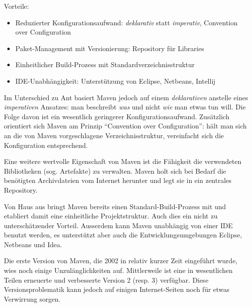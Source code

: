 \ifslides
Vorteile:
\begin{itemize}
\item Reduzierter Konfigurationsaufwand:
       {\em deklarativ} statt {\em imperativ}, Convention over Configuration
\item Paket-Management mit Versionierung: Repository für Libraries
\item Einheitlicher Build-Prozess mit Standardverzeichnisstruktur
\item IDE-Unabhängigkeit: Unterstützung von Eclipse, Netbeans, Intellij
\end{itemize}
\else
Im Unterschied zu Ant basiert Maven jedoch auf einem
{\em deklarativen} anstelle eines {\em imperativen} Ansatzes:
man beschreibt {\em was} und
nicht {\em wie} man etwas tun will. Die Folge davon ist ein
wesentlich geringerer Konfigurationsaufwand.
Zusätzlich orientiert sich Maven am Prinzip ``Convention over
Configuration'': hält man sich an die von Maven vorgeschlagene
Verzeichnisstruktur, vereinfacht sich die Konfiguration entsprechend.

Eine weitere wertvolle Eigenschaft von Maven ist die Fähigkeit
die verwendeten Bibliotheken (sog. Artefakte) zu verwalten.
Maven holt sich bei Bedarf
die benötigten Archivdateien vom Internet herunter und legt sie
in ein zentrales Repository.

Von Haus aus bringt Maven bereits
einen Standard-Build-Prozess mit und etabliert damit
eine einheitliche Projektstruktur. Auch dies ein nicht zu
unterschätzender Vorteil. Ausserdem kann Maven unabhängig von einer IDE
benutzt werden, es unterstützt aber auch die
Entwicklungsumgebungen Eclipse, Netbeans und Idea.

Die erste Version von Maven, die 2002 in relativ kurzer Zeit
eingeführt wurde, wies noch einige Unzulänglichkeiten
auf. Mittlerweile ist eine in wesentlichen Teilen erneuerte und
verbesserte Version 2 (resp. 3) verfügbar. Diese Versionsproblematik
kann jedoch auf einigen Internet-Seiten noch für etwas Verwirrung
sorgen.
\fi
\newslide
%

